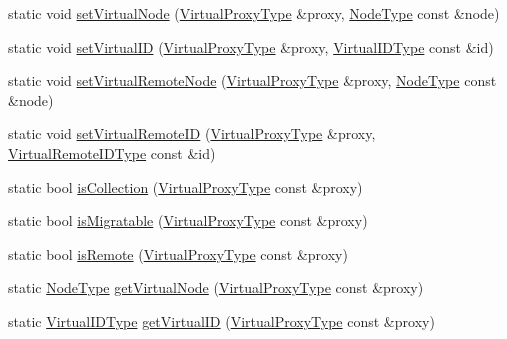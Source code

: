 \begin{DoxyCompactItemize}
\item 
static void \hyperlink{structvt_1_1vrt_1_1_virtual_proxy_builder_a9d86ac5516ac3617501680ce2c6e28c0}{set\+Virtual\+Node} (\hyperlink{namespacevt_a1b417dd5d684f045bb58a0ede70045ac}{Virtual\+Proxy\+Type} \&proxy, \hyperlink{namespacevt_a866da9d0efc19c0a1ce79e9e492f47e2}{Node\+Type} const \&node)
\item 
static void \hyperlink{structvt_1_1vrt_1_1_virtual_proxy_builder_af6ebd54a5d68ae11fa349e71c7b1bbe6}{set\+Virtual\+ID} (\hyperlink{namespacevt_a1b417dd5d684f045bb58a0ede70045ac}{Virtual\+Proxy\+Type} \&proxy, \hyperlink{namespacevt_1_1vrt_a84d0891f52f70728c3fc2172cffb464b}{Virtual\+I\+D\+Type} const \&id)
\item 
static void \hyperlink{structvt_1_1vrt_1_1_virtual_proxy_builder_afc8a88f9e489dcf37e925ae1b0442128}{set\+Virtual\+Remote\+Node} (\hyperlink{namespacevt_a1b417dd5d684f045bb58a0ede70045ac}{Virtual\+Proxy\+Type} \&proxy, \hyperlink{namespacevt_a866da9d0efc19c0a1ce79e9e492f47e2}{Node\+Type} const \&node)
\item 
static void \hyperlink{structvt_1_1vrt_1_1_virtual_proxy_builder_a531eb058c08a809d6266533e4ed597ba}{set\+Virtual\+Remote\+ID} (\hyperlink{namespacevt_a1b417dd5d684f045bb58a0ede70045ac}{Virtual\+Proxy\+Type} \&proxy, \hyperlink{namespacevt_1_1vrt_a8184ab8c530ce523edcdc4f4c38565be}{Virtual\+Remote\+I\+D\+Type} const \&id)
\item 
static bool \hyperlink{structvt_1_1vrt_1_1_virtual_proxy_builder_a87543511e2cbf4af1fc98ebf1b12161f}{is\+Collection} (\hyperlink{namespacevt_a1b417dd5d684f045bb58a0ede70045ac}{Virtual\+Proxy\+Type} const \&proxy)
\item 
static bool \hyperlink{structvt_1_1vrt_1_1_virtual_proxy_builder_ab402290d7e593c587a650b9dd1d369cc}{is\+Migratable} (\hyperlink{namespacevt_a1b417dd5d684f045bb58a0ede70045ac}{Virtual\+Proxy\+Type} const \&proxy)
\item 
static bool \hyperlink{structvt_1_1vrt_1_1_virtual_proxy_builder_a75a4a4421ad2659544b8f9c7b1958264}{is\+Remote} (\hyperlink{namespacevt_a1b417dd5d684f045bb58a0ede70045ac}{Virtual\+Proxy\+Type} const \&proxy)
\item 
static \hyperlink{namespacevt_a866da9d0efc19c0a1ce79e9e492f47e2}{Node\+Type} \hyperlink{structvt_1_1vrt_1_1_virtual_proxy_builder_a7a1da6be27725072ef4805adb879521c}{get\+Virtual\+Node} (\hyperlink{namespacevt_a1b417dd5d684f045bb58a0ede70045ac}{Virtual\+Proxy\+Type} const \&proxy)
\item 
static \hyperlink{namespacevt_1_1vrt_a84d0891f52f70728c3fc2172cffb464b}{Virtual\+I\+D\+Type} \hyperlink{structvt_1_1vrt_1_1_virtual_proxy_builder_ae19d816cebcb1999c2f0f9c8126a7127}{get\+Virtual\+ID} (\hyperlink{namespacevt_a1b417dd5d684f045bb58a0ede70045ac}{Virtual\+Proxy\+Type} const \&proxy)
\end{DoxyCompactItemize}


